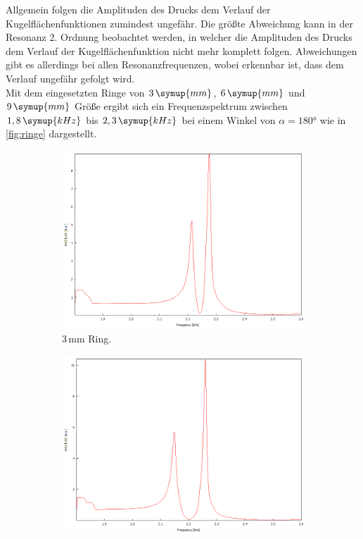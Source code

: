 Allgemein folgen die Amplituden des Drucks dem Verlauf der Kugelflächenfunktionen zumindest ungefähr.
Die größte Abweichung kann in der Resonanz 2. Ordnung beobachtet werden, in welcher die Amplituden
des Drucks dem Verlauf der Kugelflächenfunktion nicht mehr komplett folgen. Abweichungen gibt es
allerdings bei allen Resonanzfrequenzen, wobei erkennbar ist, dass dem Verlauf ungefähr gefolgt wird.\\
Mit dem eingesetzten Ringe von $3\, \symup{mm}$, $6\, \symup{mm}$ und $9\, \symup{mm}$ Größe ergibt sich ein Frequenzspektrum zwischen
$1,8 \, \symup{kHz}$ bis $2,3 \, \symup{kHz}$ bei einem Winkel von $\alpha = 180°$ wie in 
\autoref{fig:ringe} dargestellt.
\begin{figure}
    \centering
    \begin{subfigure}[b]{0.33\textwidth}
        \centering
        \includegraphics[width=\textwidth]{data/2_4/3mm.png}
        \caption{3\,mm Ring.}
    \end{subfigure}
    \hfill
    \begin{subfigure}[b]{0.33\textwidth}
        \centering
        \includegraphics[width=\textwidth]{data/2_4/6mm.png}

\end{subfigure}
\end{figure}
